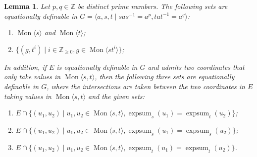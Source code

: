 \documentclass[10pt,a4paper]{amsart}
\newtheorem{lem}{Lemma}
\DeclareMathOperator{\Mon}{Mon}
\newcommand{\Z}{\mathbb{Z}}
\DeclareMathOperator{\expsum}{expsum}
\begin{document}
	\begin{lem}
		\label{GBS-defable}
		Let \(p, q \in \mathbb{Z}\) be distinct prime numbers.
		The following sets are equationally definable in
		\(G = \langle a, s, t \mid sas^{-1} = a^p, tat^{-1} = a^q \rangle\):
		\begin{enumerate}
				\item \(\Mon\langle s \rangle\) and \(\Mon\langle t \rangle\);
						\label{GBS-defable-monst}
				\item \(\{(g, t^i) \mid  i \in \Z_{\geq 0}, g \in \Mon\langle st^i
						\rangle\}\); 
						\label{GBS-defable-g-ti}
		\end{enumerate}
		In addition, if \(E\) is equationally definable
				in \(G\) and admits two coordinates that only take values in
				\(\Mon\langle s, t \rangle\), then the following three sets
				are equationally definable in \(G\), where the intersections
				are taken between the two coordinates in \(E\) taking
				values in \(\Mon \langle s, t \rangle\) and the given sets:
		\begin{enumerate}[resume]
				\item \(E \cap \{(u_1, u_2) \mid u_1, u_2 \in \Mon\langle s, t \rangle,
						\expsum_{s}(u_1) = \expsum_t(u_2)\}\); 
						\label{GBS-defable-expsum-s-t}
				\item \(E \cap \{(u_1, u_2) \mid u_1, u_2 \in \Mon\langle s, t \rangle,
						\expsum_{s}(u_1) = \expsum_s(u_2)\}\); 
						\label{GBS-defable-expsum-s-s}
				\item \(E \cap \{(u_1, u_2) \mid u_1, u_2 \in \Mon\langle s, t \rangle,
				\expsum_{t}(u_1) = \expsum_t(u_2)\}\). 
						\label{GBS-defable-expsum-t-t}
		\end{enumerate}
	\end{lem}
\end{document}
